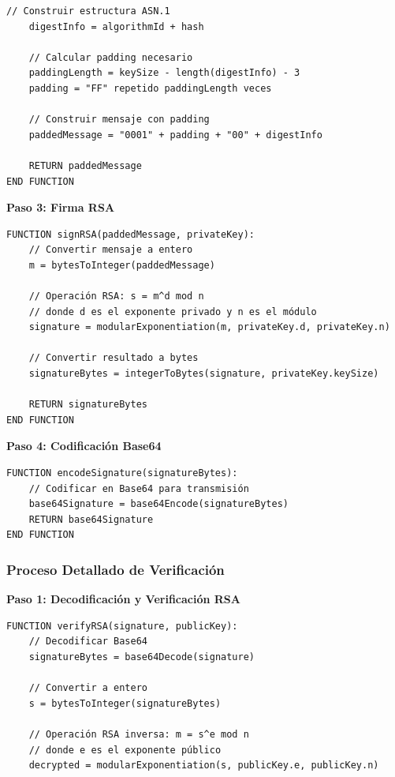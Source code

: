 {\begin{lstlisting}[language=pseudocode, caption=Padding PKCS\#1 v1.5]
    // Construir estructura ASN.1
    digestInfo = algorithmId + hash
    
    // Calcular padding necesario
    paddingLength = keySize - length(digestInfo) - 3
    padding = "FF" repetido paddingLength veces
    
    // Construir mensaje con padding
    paddedMessage = "0001" + padding + "00" + digestInfo
    
    RETURN paddedMessage
END FUNCTION
\end{lstlisting}

\textbf{Paso 3: Firma RSA}
\begin{lstlisting}[language=pseudocode, caption=Operación de firma RSA]
FUNCTION signRSA(paddedMessage, privateKey):
    // Convertir mensaje a entero
    m = bytesToInteger(paddedMessage)
    
    // Operación RSA: s = m^d mod n
    // donde d es el exponente privado y n es el módulo
    signature = modularExponentiation(m, privateKey.d, privateKey.n)
    
    // Convertir resultado a bytes
    signatureBytes = integerToBytes(signature, privateKey.keySize)
    
    RETURN signatureBytes
END FUNCTION
\end{lstlisting}

\textbf{Paso 4: Codificación Base64}
\begin{lstlisting}[language=pseudocode, caption=Codificación final]
FUNCTION encodeSignature(signatureBytes):
    // Codificar en Base64 para transmisión
    base64Signature = base64Encode(signatureBytes)
    RETURN base64Signature
END FUNCTION
\end{lstlisting}

\subsubsection{Proceso Detallado de Verificación}

\textbf{Paso 1: Decodificación y Verificación RSA}
\begin{lstlisting}[language=pseudocode, caption=Verificación de firma RSA]
FUNCTION verifyRSA(signature, publicKey):
    // Decodificar Base64
    signatureBytes = base64Decode(signature)
    
    // Convertir a entero
    s = bytesToInteger(signatureBytes)
    
    // Operación RSA inversa: m = s^e mod n
    // donde e es el exponente público
    decrypted = modularExponentiation(s, publicKey.e, publicKey.n)
    

\end{lstlisting}}
